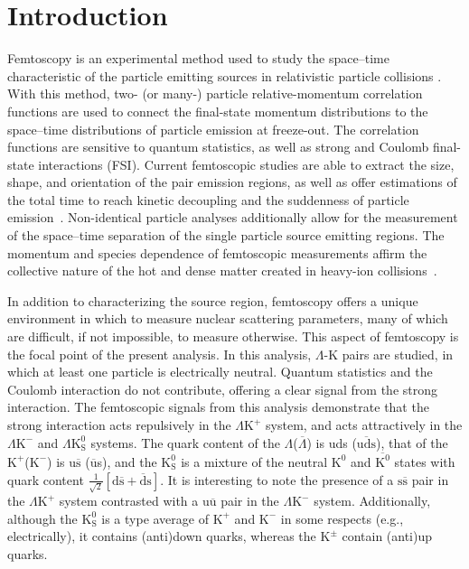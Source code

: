 \documentclass[ALICE,manyauthors]{cernphprep}
\newcommand{\Lam}{$\Lambda$\xspace}
\newcommand{\ALam}{$\overline{\Lambda}$\xspace}
\newcommand{\KchP}{$\mathrm{K^{+}}$\xspace}
\newcommand{\KchM}{$\mathrm{K^{-}}$\xspace}
\newcommand{\Kpm}{$\mathrm{K^{\pm}}$\xspace}
\newcommand{\Ks}{$\mathrm{K^{0}_{S}}$\xspace}
\newcommand{\LamKchP}{$\Lambda\mathrm{K^{+}}$\xspace}
\newcommand{\LamKchM}{$\Lambda\mathrm{K^{-}}$\xspace}
\newcommand{\LamKs}{$\Lambda\mathrm{K^{0}_{S}}$\xspace}
\begin{document}
\section{Introduction}
\label{sec:Introduction}

Femtoscopy is an experimental method used to study the space--time characteristic of the particle emitting sources in relativistic particle collisions \cite{Lisa:2005dd}.  
With this method, two- (or many-) particle relative-momentum correlation functions are used to connect the final-state momentum distributions to the space--time distributions of particle emission at freeze-out.  
The correlation functions are sensitive to quantum statistics, as well as strong and Coulomb final-state interactions (FSI).  
Current femtoscopic studies are able to extract the size, shape, and orientation of the pair emission regions, as well as offer estimations of the total time to reach kinetic decoupling and the suddenness of particle emission~\cite{Lisa:2005dd, Lisa:2008gf}.
Non-identical particle analyses additionally allow for the measurement of the space--time separation of the single particle source emitting regions.
The momentum and species dependence of femtoscopic measurements affirm the collective nature of the hot and dense matter created in heavy-ion collisions~\cite{Akkelin:1995gh}.

In addition to characterizing the source region, femtoscopy offers a unique environment in which to measure nuclear scattering parameters, many of which are difficult, if not impossible, to measure otherwise.  
This aspect of femtoscopy is the focal point of the present analysis. 
In this analysis, \Lam-K pairs are studied, in which at least one particle is electrically neutral.  
Quantum statistics and the Coulomb interaction do not contribute, offering a clear signal from the strong interaction.
The femtoscopic signals from this analysis demonstrate that the strong interaction acts repulsively in the \LamKchP system, and acts attractively in the \LamKchM and \LamKs systems.
The quark content of the \Lam (\ALam) is uds ($\overline{\mathrm{uds}}$), that of the \KchP (\KchM) is u$\overline{\mathrm{s}}$ ($\overline{\mathrm{u}}$s), and the \Ks is a mixture of the neutral $\mathrm{K}^{0}$ and $\overline{\mathrm{K}^{0}}$ states with quark content $\frac{1}{\sqrt{2}}\left[\mathrm{d\overline{s} + \overline{d}s}\right]$.
It is interesting to note the presence of a $\mathrm{s\overline{s}}$ pair in the \LamKchP system contrasted with a $\mathrm{u\overline{u}}$ pair in the \LamKchM system.
Additionally, although the \Ks is a type average of \KchP and \KchM in some respects (e.g., electrically), it contains (anti)down quarks, whereas the \Kpm contain (anti)up quarks.
\end{document}
